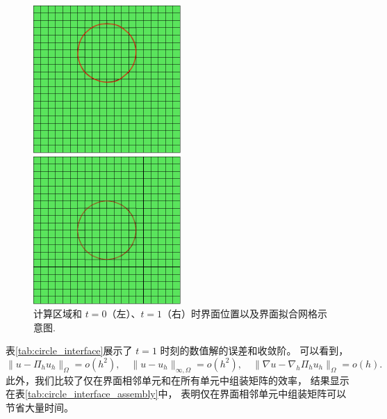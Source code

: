 \begin{figure}[H]
    \begin{minipage}[t]{0.49\linewidth}
        \centering
        \includegraphics[width=0.5\textwidth]{./figures/movingmaxwell/circle_interface_0.pdf}
    \end{minipage}
    \begin{minipage}[t]{0.49\linewidth}
        \centering
        \includegraphics[width=0.5\textwidth]{./figures/movingmaxwell/circle_interface_1.pdf}
    \end{minipage}
    \caption{计算区域和 $t=0$（左）、$t=1$（右）时界面位置以及界面拟合网格示意图.}
    \label{fig:circle_interface}
\end{figure}

表\ref{tab:circle_interface}展示了 $t = 1$ 时刻的数值解的误差和收敛阶。
可以看到，
$$
\|u-\Pi_h u_h\|_{\Omega} = o(h^2), \quad \|u - u_h\|_{\infty,\Omega} = o(h^2),
\quad \|\nabla u-\nabla_h \Pi_h u_h \|_{\Omega} = o(h).
$$
此外，我们比较了仅在界面相邻单元和在所有单元中组装矩阵的效率，
结果显示在表\ref{tab:circle_interface_assembly}中，
表明仅在界面相邻单元中组装矩阵可以节省大量时间。

